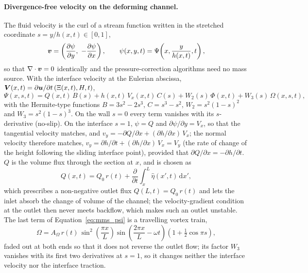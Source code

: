 \paragraph{Divergence-free velocity on the deforming channel.}
The fluid velocity is the curl of a stream function written in the stretched coordinate $s = y/h(x,t) \in [0,1]$,
\begin{equation}
	\boldsymbol{v} = \left(\frac{\partial\psi}{\partial y},\ -\frac{\partial\psi}{\partial x}\right),
	\qquad
	\psi(x,y,t) = \Psi\!\left(x, \frac{y}{h(x,t)}, t\right),
\end{equation}
so that $\nabla\cdot\boldsymbol{v} = 0$ identically and the pressure-correction algorithms need no mass source.
With the interface velocity at the Eulerian abscissa, $\boldsymbol{V}(x,t) = \partial\boldsymbol{u}/\partial t\,(\Xi(x,t), H, t)$,
\begin{equation}
	\Psi(x,s,t) = Q(x,t)\,B(s) + h(x,t)\,V_x(x,t)\,C(s) + W_2(s)\,\Phi(x,t) + W_3(s)\,\Omega(x,s,t),
	\label{eq:mms_psi}
\end{equation}
with the Hermite-type functions $B = 3s^2 - 2s^3$, $C = s^3 - s^2$, $W_2 = s^2(1-s)^2$ and $W_3 = s^2(1-s)^3$.
On the wall $s = 0$ every term vanishes with its $s$-derivative (no-slip).
On the interface $s = 1$, $\psi = Q$ and $\partial\psi/\partial y = V_x$, so that the tangential velocity matches, and $v_y = -\partial Q/\partial x + (\partial h/\partial x)\,V_x$; the normal velocity therefore matches, $v_y = \partial h/\partial t + (\partial h/\partial x)\,V_x = V_y$ (the rate of change of the height following the sliding interface point), provided that $\partial Q/\partial x = -\partial h/\partial t$.
$Q$ is the volume flux through the section at $x$, and is chosen as
\begin{equation}
	Q(x,t) = Q_0\,r(t) + \frac{\partial}{\partial t}\int_x^L \hat\eta(x',t)\,\mathrm{d}x',
\end{equation}
which prescribes a non-negative outlet flux $Q(L,t) = Q_0\,r(t)$ and lets the inlet absorb the change of volume of the channel; the velocity-gradient condition at the outlet then never meets backflow, which makes such an outlet unstable.
The last term of Equation~\eqref{eq:mms_psi} is a travelling vortex train,
\begin{equation}
	\Omega = A_\Omega\,r(t)\,\sin^2\!\left(\frac{\pi x}{L}\right)\sin\!\left(\frac{2\pi x}{L} - \omega t\right)\left(1 + \tfrac12\cos\pi s\right),
\end{equation}
faded out at both ends so that it does not reverse the outlet flow; its factor $W_3$ vanishes with its first two derivatives at $s = 1$, so it changes neither the interface velocity nor the interface traction.

